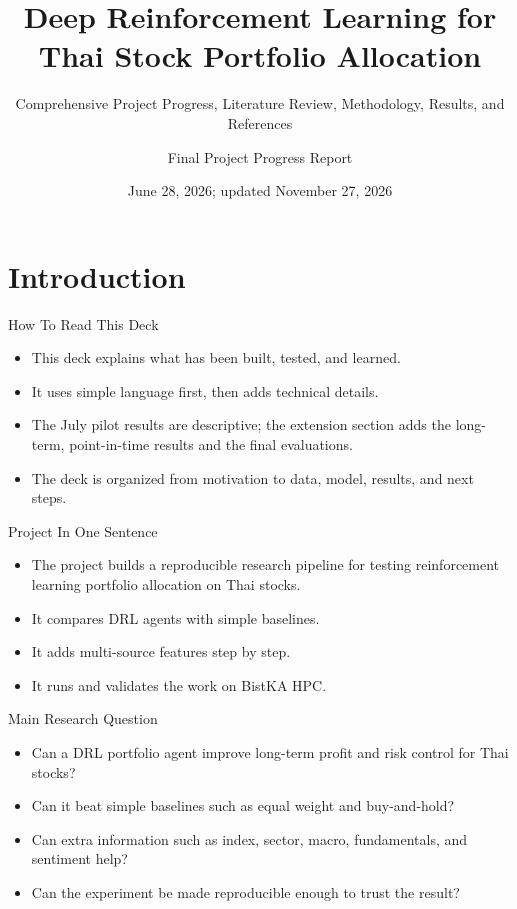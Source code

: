 \documentclass[aspectratio=43,10pt]{beamer}
\title[Thai Stock DRL Project]{Deep Reinforcement Learning for Thai Stock Portfolio Allocation}
\subtitle{Comprehensive Project Progress, Literature Review, Methodology, Results, and References}
\author{Final Project Progress Report}
\institute{BistKA HPC Project: \texttt{/lustrefs/project/25sfcs03/drl\_thai\_stock}}
\date{June 28, 2026; updated November 27, 2026}
\begin{document}
\begin{frame}
  \titlepage
\end{frame}

\section{Introduction}

\begin{frame}{How To Read This Deck}
\begin{itemize}
  \item This deck explains what has been built, tested, and learned.
  \item It uses simple language first, then adds technical details.
  \item The July pilot results are descriptive; the extension section adds the long-term, point-in-time results and the final evaluations.
  \item The deck is organized from motivation to data, model, results, and next steps.
\end{itemize}
\end{frame}

\begin{frame}{Project In One Sentence}
\begin{itemize}
  \item The project builds a reproducible research pipeline for testing reinforcement learning portfolio allocation on Thai stocks.
  \item It compares DRL agents with simple baselines.
  \item It adds multi-source features step by step.
  \item It runs and validates the work on BistKA HPC.
\end{itemize}
\end{frame}

\begin{frame}{Main Research Question}
\begin{itemize}
  \item Can a DRL portfolio agent improve long-term profit and risk control for Thai stocks?
  \item Can it beat simple baselines such as equal weight and buy-and-hold?
  \item Can extra information such as index, sector, macro, fundamentals, and sentiment help?
  \item Can the experiment be made reproducible enough to trust the result?
\end{itemize}
\end{frame}
\end{document}
